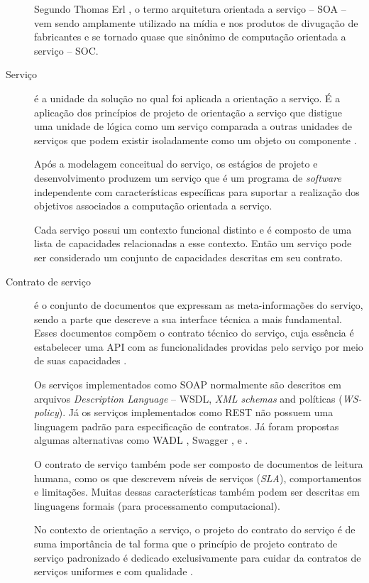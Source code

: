 \begin{description}
Segundo Thomas Erl \cite{erl2009web}, o termo arquitetura orientada a serviço --
SOA -- vem sendo amplamente utilizado na mídia e nos produtos de divugação de
fabricantes e se tornado quase que sinônimo de computação orientada a
serviço -- SOC.

\item [Serviço] é a unidade da solução no qual foi aplicada a orientação a
serviço. É a aplicação dos princípios de projeto de orientação a
serviço que distigue uma unidade de lógica como um serviço comparada a outras
unidades de serviços que podem existir isoladamente como um objeto ou
componente \cite{erl2009web}.

Após a modelagem conceitual do serviço, os estágios de projeto e desenvolvimento
produzem um serviço que é um programa de \textit{software} independente com
características específicas para suportar a realização dos objetivos associados
a computação orientada a serviço.

Cada serviço possui um contexto funcional distinto e é composto de uma lista
de capacidades relacionadas a esse contexto. Então um serviço pode ser
considerado um conjunto de capacidades descritas em seu contrato.


\item [Contrato de serviço] é o conjunto de documentos que expressam as
meta-informações do serviço, sendo a parte que descreve a
sua interface técnica a mais fundamental. Esses documentos compõem o contrato
técnico do serviço, cuja essência é estabelecer uma API com as funcionalidades providas pelo serviço por meio de
suas capacidades \cite{erl2009web}.

Os serviços implementados como \ws{} SOAP normalmente são descritos em
arquivos \ws{} \textit{Description Language} -- WSDL, \textit{XML
schemas} and políticas (\textit{WS-policy}). Já os serviços implementados como \ws{} REST não
possuem uma linguagem padrão para especificação de contratos. Já foram propostas
algumas alternativas como WADL \cite{hadley2006web}, Swagger \cite{swaggerSite},
e \neoidl{} \cite{lima2015neoidl}.

O contrato de serviço também pode ser composto de documentos de leitura humana,
como os que descrevem níveis de serviços (\textit{SLA}), comportamentos e
limitações. Muitas dessas características também podem ser descritas em
linguagens formais (para processamento computacional).

No contexto de orientação a serviço, o projeto do contrato do serviço é de suma
importância de tal forma que o princípio de projeto contrato de serviço
padronizado é dedicado exclusivamente para cuidar da contratos de serviços
uniformes e com qualidade \cite{erl2009web}.

\end{description}


